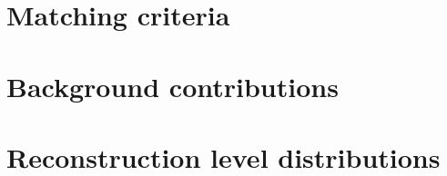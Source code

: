 \section{Matching criteria}
\section{Background contributions}
\section{Reconstruction level distributions}